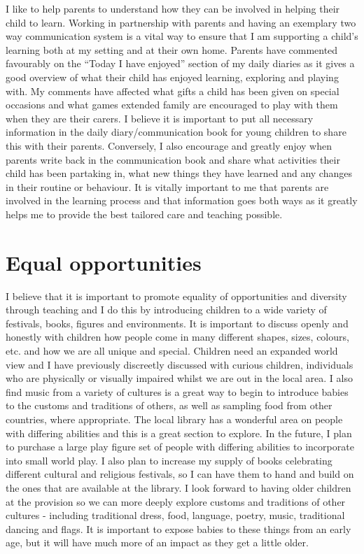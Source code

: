 \documentclass[10pt,a4paper]{report}
\begin{document}
I like to help parents to understand how they can be involved in helping their child to learn. Working in partnership with parents and having an exemplary two way communication system is a vital way to ensure that I am supporting a child's learning both at my setting and at their own home. Parents have commented favourably on the “Today I have enjoyed” section of my daily diaries as it gives a good overview of what their child has enjoyed learning, exploring and playing with. My comments have affected what gifts a child has been given on special occasions and what games extended family are encouraged to play with them when they are their carers. I believe it is important to put all necessary information in the daily diary/communication book for young children to share this with their parents. Conversely, I also encourage and greatly enjoy when parents write back in the communication book and share what activities their child has been partaking in, what new things they have learned and any changes in their routine or behaviour. It is vitally important to me that parents are involved in the learning process and that information goes both ways as it greatly helps me to provide the best tailored care and teaching possible. 

\section{Equal opportunities}

I believe that it is important to promote equality of opportunities and diversity through teaching and I do this by introducing children to a wide variety of festivals, books, figures and environments. It is important to discuss openly and honestly with children how people come in many different shapes, sizes, colours, etc. and how we are all unique and special. Children need an expanded world view and I have previously discreetly discussed with curious children, individuals who are physically or visually impaired whilst we are out in the local area. I also find music from a variety of cultures is a great way to begin to introduce babies to the customs and traditions of others, as well as sampling food from other countries, where appropriate. The local library has a wonderful area on people with differing abilities and this is a great section to explore. In the future, I plan to purchase a large play figure set of people with differing abilities to incorporate into small world play. I also plan to increase my supply of books celebrating different cultural and religious festivals, so I can have them to hand and build on the ones that are available at the library. I look forward to having older children at the provision so we can more deeply explore customs and traditions of other cultures - including traditional dress, food, language, poetry, music, traditional dancing and flags. It is important to expose babies to these things from an early age, but it will have much more of an impact as they get a little older. 
\end{document}
